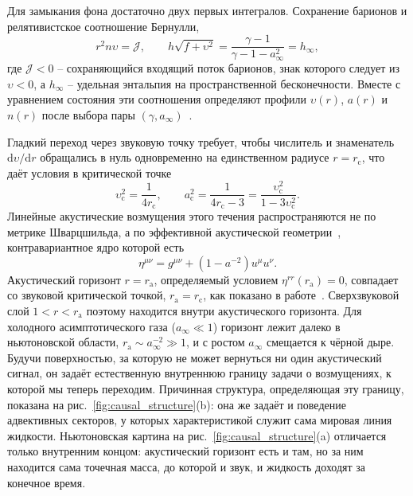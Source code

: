 \documentclass[12pt,a4paper,preprint,nopreprintline]{elsarticle}
\begin{document}
Для замыкания фона достаточно двух первых интегралов. Сохранение барионов и релятивистское соотношение Бернулли,
\begin{equation}
    r^{2}n\upsilon=\mathcal{J},
    \qquad
    h\sqrt{f+\upsilon^{2}}=
    \frac{\gamma-1}{\gamma-1-a_{\infty}^{2}}=
    h_{\infty},
    \label{eq:michel_integrals}
\end{equation}
где $\mathcal{J}<0$ -- сохраняющийся входящий поток барионов, знак которого следует из $\upsilon<0$, а $h_{\infty}$ -- удельная энтальпия на пространственной бесконечности. Вместе с уравнением состояния эти соотношения определяют профили $\upsilon(r)$, $a(r)$ и $n(r)$ после выбора пары $(\gamma,a_{\infty})$~\cite{MichelFC_AccretionOfMatterByCondensedObjects_1972}.

Гладкий переход через звуковую точку требует, чтобы числитель и знаменатель $\mathrm{d}\upsilon/\mathrm{d}r$ обращались в нуль одновременно на единственном радиусе $r=r_{\mathrm{c}}$, что даёт условия в критической точке
\begin{equation}
    \upsilon_{\mathrm{c}}^{2}=\frac{1}{4r_{\mathrm{c}}},
    \qquad
    a_{\mathrm{c}}^{2}=
    \frac{1}{4r_{\mathrm{c}}-3}=
    \frac{\upsilon_{\mathrm{c}}^{2}}{1-3\upsilon_{\mathrm{c}}^{2}}.
    \label{eq:sonic_conditions}
\end{equation}
Линейные акустические возмущения этого течения распространяются не по метрике Шварцшильда, а по эффективной акустической геометрии~\cite{SemyannikovAV_AcousticGeometryAndSoundRayDynamics_2026,VisserM_AcousticBlackHolesHorizonsErgospheresAndHawkingRadiation_1998,BilicN_RelativisticAcousticGeometry_1999}, контравариантное ядро которой есть
\begin{equation}
    \eta^{\mu\nu}
    =
    g^{\mu\nu}+\left(1-a^{-2}\right)u^{\mu}u^{\nu}.
    \label{eq:acoustic_core}
\end{equation}
Акустический горизонт $r=r_{\mathrm{a}}$, определяемый условием $\eta^{rr}(r_{\mathrm{a}})=0$, совпадает со звуковой критической точкой, $r_{\mathrm{a}}=r_{\mathrm{c}}$, как показано в работе~\cite{SemyannikovAV_AcousticGeometryAndSoundRayDynamics_2026}. Сверхзвуковой слой $1<r<r_{\mathrm{a}}$ поэтому находится внутри акустического горизонта. Для холодного асимптотического газа ($a_{\infty}\ll1$) горизонт лежит далеко в ньютоновской области, $r_{\mathrm{a}}\sim a_{\infty}^{-2}\gg1$, и с ростом $a_{\infty}$ смещается к чёрной дыре. Будучи поверхностью, за которую не может вернуться ни один акустический сигнал, он задаёт естественную внутреннюю границу задачи о возмущениях, к которой мы теперь переходим. Причинная структура, определяющая эту границу, показана на рис.~\ref{fig:causal_structure}(b): она же задаёт и поведение адвективных секторов, у которых характеристикой служит сама мировая линия жидкости. Ньютоновская картина на рис.~\ref{fig:causal_structure}(a) отличается только внутренним концом: акустический горизонт есть и там, но за ним находится сама точечная масса, до которой и звук, и жидкость доходят за конечное время.
\end{document}
